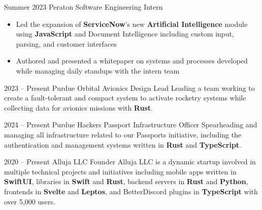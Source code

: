\documentclass[
	10pt, %
]{FreemanCV}
\begin{document}
\begin{paracol}{2}
	\jobentry
	{Summer 2023} %
	{} %
	{Peraton} %
	{Software Engineering Intern} %
	{\vspace{-7mm}\begin{itemize}
			\item Led the expansion of \textbf{ServiceNow}'s new \textbf{Artificial Intelligence} module using \textbf{JavaScript} and Document Intelligence including custom input,\\ parsing, and customer interfaces
			\item Authored and presented a whitepaper on systems and processes developed while managing daily standups with the intern team %
		\end{itemize}} %


	\jobentry
	{2023 -- Present} %
	{} %
	{Purdue Orbital} %
	{Avionics Design Lead} %
	{Leading a team working to create a fault-tolerant and compact system to activate rocketry systems while collecting data for avionics missions with \textbf{Rust}.} %

	\jobentry
	{2024 -- Present}
	{}
	{Purdue Hackers}
	{Passport Infrastructure Officer}
	{Spearheading and managing all infrastructure related to our Passports initiative, including the authentication and management systems written in \textbf{Rust} and \textbf{TypeScript}.}


	\jobentry
	{2020 -- Present} %
	{} %
	{Alluja LLC} %
	{Founder} %
	{Alluja LLC is a dynamic startup involved in multiple technical projects and initiatives including mobile apps written in \textbf{SwiftUI}, libraries in \textbf{Swift} and \textbf{Rust}, backend servers in \textbf{Rust} and \textbf{Python}, frontends in \textbf{Svelte} and \textbf{Leptos}, and BetterDiscord plugins in \textbf{TypeScript} with over 5,000 users.} %


\end{paracol}
\end{document}
